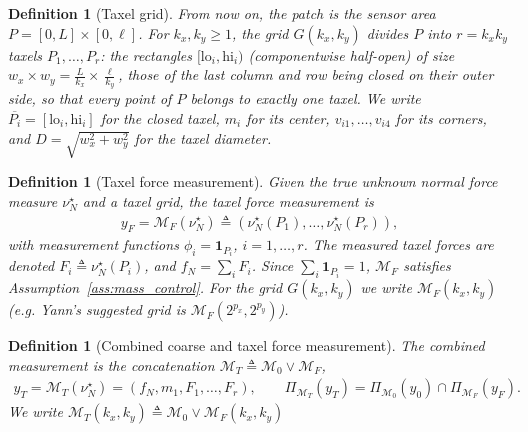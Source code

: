 \documentclass[11pt,a4paper]{article}
\theoremstyle{plain}
\newtheorem{definition}[theorem]{Definition}
\begin{document}
\begin{definition}[Taxel grid]
\label{def:grid}
    From now on, the patch is the sensor area $P=[0,L]\times[0,\ell]$. For $k_x,k_y\ge1$, the grid $G(k_x,k_y)$ divides $P$ into $r=k_xk_y$ \textit{taxels} $P_1,\ldots,P_r$: the rectangles
    $[\mathrm{lo}_i,\mathrm{hi}_i)$ (componentwise half-open) of size $w_x\times w_y=\frac{L}{k_x}\times\frac{\ell}{k_y}$, those of the last column and row being closed on their outer side,
    so that every point of $P$ belongs to exactly one taxel. We write $\overline{P_i}=[\mathrm{lo}_i,\mathrm{hi}_i]$ for the closed taxel, $m_i$ for its center, $v_{i1},\ldots,v_{i4}$ for its
    corners, and $D=\sqrt{w_x^2+w_y^2}$ for the taxel diameter. 
\end{definition}

\begin{definition}[Taxel force measurement]\label{def:MF}
    Given the true unknown normal force measure $\nu_N^\star$ and a taxel grid, the \textit{taxel force measurement} is
    \begin{align}
    y_F = \mathcal M_F(\nu_N^\star) \triangleq
    \left(
    \nu_N^\star(P_1),\ldots,\nu_N^\star(P_r)
    \right),
    \end{align}
    with measurement functions $\phi_i=\mathbf 1_{P_i}$, $i=1,\ldots,r$. The measured taxel forces are denoted $F_i\triangleq\nu_N^\star(P_i)$, and $f_N=\sum_iF_i$.
    Since $\sum_i\mathbf 1_{P_i}=1$, $\mathcal M_F$ satisfies Assumption~\ref{ass:mass_control}. 
    For the grid $G(k_x,k_y)$ we write $\mathcal M_F(k_x,k_y)$ (e.g. Yann's suggested grid is $\mathcal M_F(2^{p_x},2^{p_y})$).
\end{definition}

\begin{definition}[Combined coarse and taxel force measurement]
\label{def:MT}
The \textit{combined measurement} is the concatenation $\mathcal M_T\triangleq\mathcal M_0\vee\mathcal M_F$,
\begin{align}
    y_T=\mathcal M_T(\nu_N^\star)
    = \left(f_N,m_1, F_1,\ldots,F_r\right),
    \qquad
    \Pi_{\mathcal M_T}(y_T)=\Pi_{\mathcal M_0}(y_0)\cap\Pi_{\mathcal M_F}(y_F).
\end{align}
We write $\mathcal M_T(k_x,k_y)\triangleq\mathcal M_0\vee\mathcal M_F(k_x,k_y)$ 
\end{definition}
\end{document}
